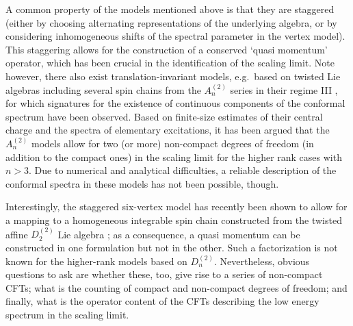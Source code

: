 \documentclass[12pt]{article}
\numberwithin{equation}{section}
\begin{document}
A common property of the models mentioned above is that they are staggered (either by choosing alternating representations of the underlying algebra, or by considering inhomogeneous shifts of the spectral parameter in the vertex model).  This staggering allows for the construction of a conserved `quasi momentum' operator, which has been crucial in the identification of the scaling limit.  Note however, there also exist translation-invariant models, e.g.\ based on twisted Lie algebras  including several spin chains from the $A^{(2)}_{n}$ series in their regime III \cite{VeJS14,VeJS14a,VeJS16a}, for which signatures for the existence of continuous components of the conformal spectrum have been observed.  Based on finite-size estimates of their central charge and the spectra of elementary excitations, it has been argued that the $A^{(2)}_n$ models allow for two (or more) non-compact degrees of freedom (in addition to the compact ones) in the scaling limit for the higher rank cases with $n>3$.  Due to numerical and analytical difficulties, a reliable description of the conformal spectra in these models has not been possible, though.

Interestingly, the staggered six-vertex model has recently been shown to allow for a mapping to a homogeneous integrable spin chain constructed from the twisted affine $D_2^{(2)}$ Lie algebra \cite{RPJS20}; as a consequence, a quasi momentum can be constructed in one formulation but not in the other.  Such a factorization is not known for the higher-rank models based on $D^{(2)}_{n}$.  Nevertheless, obvious questions to ask are whether these, too, give rise to a series of non-compact CFTs; what is the counting of compact and non-compact degrees of freedom; and finally, what is the operator content of the CFTs describing the low energy spectrum in the scaling limit. 
\end{document}
